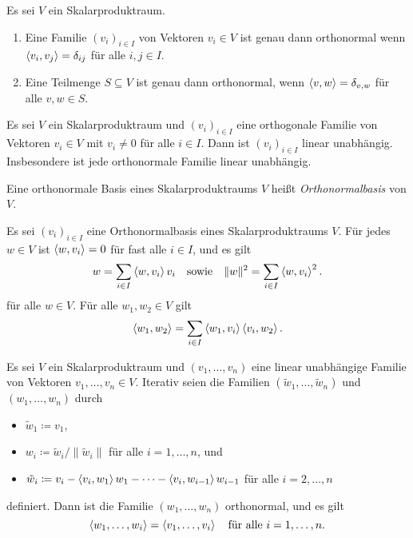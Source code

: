 \begin{lemma}
  Es sei $V$ ein Skalarproduktraum.
  \begin{enumerate}[leftmargin=*]
    \item
      Eine Familie $(v_i)_{i \in I}$ von Vektoren $v_i \in V$ ist genau dann orthonormal wenn \mbox{$\left\langle v_i, v_j \right\rangle = \delta_{ij}$} für alle $i,j \in I$.
    \item
      Eine Teilmenge $S \subseteq V$ ist genau dann orthonormal, wenn $\left\langle v, w \right\rangle = \delta_{v,w}$ für alle $v, w \in S$.
  \end{enumerate}  
\end{lemma}


\begin{lemma}
  Es sei $V$ ein Skalarproduktraum und $(v_i)_{i \in I}$ eine orthogonale Familie von Vektoren $v_i \in V$ mit $v_i \neq 0$ für alle $i \in I$.
  Dann ist $(v_i)_{i \in I}$ linear unabhängig.
  Insbesondere ist jede orthonormale Familie linear unabhängig.
\end{lemma}


\begin{definition}
  Eine orthonormale Basis eines Skalarproduktraums $V$ heißt \emph{Orthonormalbasis} von $V$.
\end{definition}


\begin{proposition}
  Es sei $(v_i)_{i \in I}$ eine Orthonormalbasis eines Skalarproduktraums $V$.
  Für jedes $w \in V$ ist $\left\langle w, v_i \right\rangle = 0$ für fast alle $i \in I$, und es gilt
  \begin{gather*}
    w = \sum_{i \in I} \left\langle w, v_i \right\rangle v_i
  \quad\text{sowie}\quad
    \|w\|^2 = \sum_{i \in I} \left\langle w, v_i \right\rangle^2.
  \end{gather*}
  für alle $w \in V$.
  Für alle $w_1, w_2 \in V$ gilt
  \[
    \left\langle w_1, w_2 \right\rangle
    = \sum_{i \in I} \left\langle w_1, v_i \right\rangle \left\langle v_i, w_2 \right\rangle.
  \]
\end{proposition}


\begin{theorem}
  Es sei $V$ ein Skalarproduktraum und $(v_1, \dotsc, v_n)$ eine linear unabhängige Familie von Vektoren $v_1, \dotsc, v_n \in V$.
  Iterativ seien die Familien $(\tilde{w}_1, \dotsc, \tilde{w}_n)$ und $(w_1, \dotsc, w_n)$ durch
  \begin{itemize}
    \item
      $\tilde{w}_1 \coloneqq v_1$,
    \item
      $w_i \coloneqq \tilde{w}_i/\|\tilde{w}_i\|$ für alle $i = 1, \dotsc, n$, und
    \item
      $\tilde{w}_i \coloneqq v_i - \left\langle v_i, w_1 \right\rangle w_1 - \dotsb - \left\langle v_i, w_{i-1} \right\rangle w_{i-1}$ für alle $i = 2, \dotsc, n$
  \end{itemize}
  definiert.
  Dann ist die Familie $(w_1, \dotsc, w_n)$ orthonormal, und es gilt
  \[
    \left\langle w_1, \dotsc, w_i \right\rangle = \left\langle v_1, \dotsc, v_i \right\rangle
    \quad
    \text{für alle $i = 1, \dotsc, n$}.
  \]
\end{theorem}


